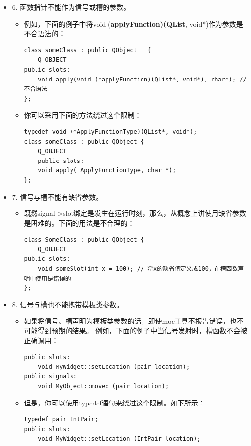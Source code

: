 \documentclass[9pt,b5paper]{article}
\begin{document}
\begin{itemize}
\item 6. 函数指针不能作为信号或槽的参数。
\begin{itemize}
\item 例如，下面的例子中将void (\textbf{applyFunction)(QList}, void*)作为参数是不合语法的：
\lstset{language=java,label= ,caption= ,numbers=none}
\begin{lstlisting}
class someClass : public QObject   {  
    Q_OBJECT  
public slots:  
    void apply(void (*applyFunction)(QList*, void*), char*); // 不合语法  
};
\end{lstlisting}
\item 你可以采用下面的方法绕过这个限制：
\lstset{language=java,label= ,caption= ,numbers=none}
\begin{lstlisting}
typedef void (*ApplyFunctionType)(QList*, void*);  
class someClass : public QObject {  
    Q_OBJECT  
    public slots:  
    void apply( ApplyFunctionType, char *);  
};
\end{lstlisting}
\end{itemize}
\item 7. 信号与槽不能有缺省参数。
\begin{itemize}
\item 既然signal->slot绑定是发生在运行时刻，那么，从概念上讲使用缺省参数是困难的。下面的用法是不合理的：
\lstset{language=java,label= ,caption= ,numbers=none}
\begin{lstlisting}
class SomeClass : public QObject {  
    Q_OBJECT  
public slots:  
    void someSlot(int x = 100); // 将x的缺省值定义成100，在槽函数声明中使用是错误的  
};
\end{lstlisting}
\end{itemize}
\item 8. 信号与槽也不能携带模板类参数。
\begin{itemize}
\item 如果将信号、槽声明为模板类参数的话，即使moc工具不报告错误，也不可能得到预期的结果。 例如，下面的例子中当信号发射时，槽函数不会被正确调用：
\lstset{language=java,label= ,caption= ,numbers=none}
\begin{lstlisting}
public slots:  
    void MyWidget::setLocation (pair location);  
public signals:
    void MyObject::moved (pair location);
\end{lstlisting}
\item 但是，你可以使用typedef语句来绕过这个限制。如下所示：
\lstset{language=java,label= ,caption= ,numbers=none}
\begin{lstlisting}
typedef pair IntPair;  
public slots:  
    void MyWidget::setLocation (IntPair location);  

\end{lstlisting}
\end{itemize}
\end{itemize}
\end{document}
